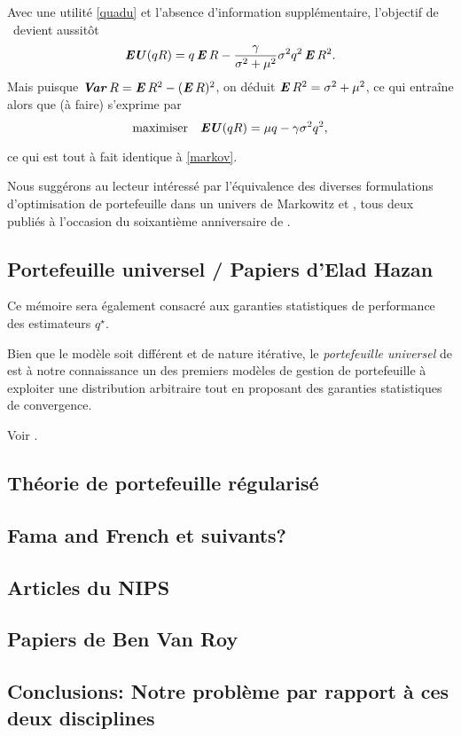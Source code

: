 Avec une utilité \eqref{quadu} et l'absence d'information supplémentaire, l'objectif de
\cit\ devient aussitôt
\begin{equation}
  \label{euquad}
  \operatorname{\mbox{\textbf{\textit{EU}}}}(qR) = q \operatorname{\mbox{\textbf{\textit{E}}}} R - \frac{\gamma}{\sigma^2+\mu^2}\sigma^2 q^2\operatorname{\mbox{\textbf{\textit{E}}}} R^2.
\end{equation}
Mais puisque $\operatorname{\mbox{\textbf{\textit{Var}}}} R = \operatorname{\mbox{\textbf{\textit{E}}}} R^2 - (\operatorname{\mbox{\textbf{\textit{E}}}} R)^2$, on déduit $\operatorname{\mbox{\textbf{\textit{E}}}} R^2 = \sigma^2 + \mu^2$, ce qui entraîne
alors que (à faire) s'exprime par
\begin{equation}
  \displaystyle{\begin{array}{ll} \displaystyle{\operatorname*{\mbox{maximiser}}_{}} & \displaystyle{\operatorname{\mbox{\textbf{\textit{EU}}}}(qR) = \mu q - \gamma\sigma^2 q^2,} \end{array}}
\end{equation}
ce qui est tout à fait identique à \eqref{markov}.

Nous suggérons au lecteur intéressé par l'équivalence des diverses formulations
d'optimisation de portefeuille dans un univers de Markowitz \cite{bodnar2013equivalence}
et \cite{markowitz2014mean}, tous deux publiés à l'occasion du soixantième anniversaire de
\cite{markowitz1952portfolio}.

\subsection{Portefeuille universel / Papiers d'Elad Hazan}

Ce mémoire sera également consacré aux garanties statistiques de performance des
estimateurs $q^\star$.

Bien que le modèle soit différent et de nature itérative, le \textit{portefeuille
  universel} de \cite{cover1991universal} est à notre connaissance un des premiers modèles
de gestion de portefeuille à exploiter une distribution arbitraire tout en proposant des
garanties statistiques de convergence.

Voir \cite{cover1991universal,hazan2015online}.


\subsection{Théorie de portefeuille régularisé}

\cite{ban2016machine}

\subsection{Fama and French et suivants?}

\cite{fama1993common}


\subsection{Articles du NIPS}

\subsection{Papiers de Ben Van Roy}

\subsection{Conclusions: Notre problème par rapport à ces deux disciplines}

